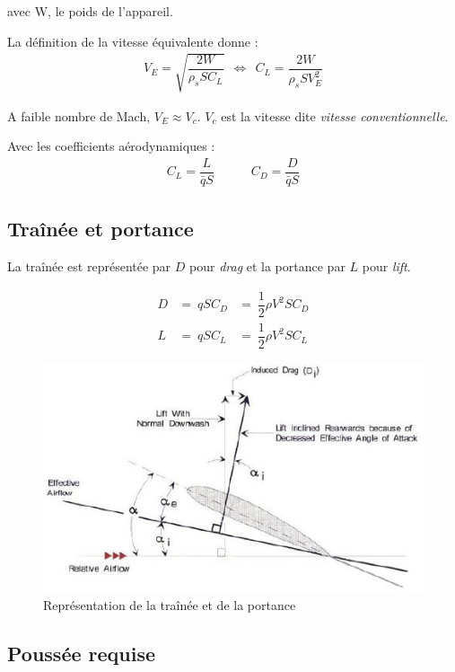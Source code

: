 \documentclass{report}
\begin{document}
avec W, le poids de l'appareil.

La définition de la vitesse équivalente donne :
\begin{eqnarray}
V_E=\sqrt{\dfrac{2W}{\rho_s S C_L}} ~~\Leftrightarrow~~ C_L = \dfrac{2W}{\rho_s S V_E^2}
\end{eqnarray}

A faible nombre de Mach, $V_E\approx V_c$. $V_c$ est la vitesse dite \textit{vitesse conventionnelle}.

Avec les coefficients aérodynamiques :
\begin{eqnarray}
C_L=\dfrac{L}{\bar{q}S} &~~~~~~&C_D=\dfrac{D}{\bar{q}S}
\end{eqnarray}

\subsection{Traînée et portance}

La traînée est représentée par $D$ pour \textit{drag} et la portance par $L$ pour \textit{lift}.

\begin{eqnarray}
D&= ~qSC_D&=~\dfrac{1}{2}\rho V^2 S C_D\\
L&= ~qSC_L &=~\dfrac{1}{2}\rho V^2 S C_L
\end{eqnarray}

\begin{figure}[h!]
    \centering
    \includegraphics{4.JPG}
    \caption{Représentation de la traînée et de la portance}
    \label{4}
\end{figure}

\subsection{Poussée requise}
\end{document}

